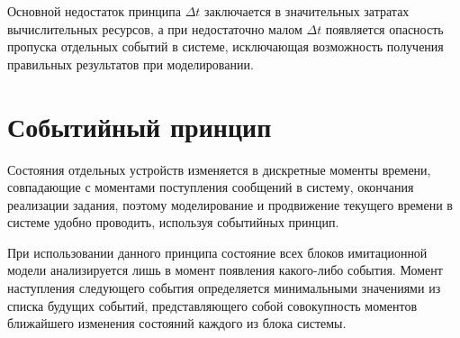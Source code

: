 Основной недостаток принципа $\Delta t$ заключается в значительных затратах вычислительных ресурсов, а при недостаточно малом $\Delta t$ появляется опасность пропуска отдельных событий в системе, исключающая возможность получения правильных результатов при моделировании.

\chapter{Событийный принцип}

Состояния отдельных устройств изменяется в дискретные моменты времени, совпадающие с моментами поступления сообщений в систему, окончания реализации задания, поэтому моделирование и продвижение текущего времени в системе удобно проводить, используя событийных принцип.

При использовании данного принципа состояние всех блоков имитационной модели анализируется лишь в момент появления какого-либо события. 
Момент наступления следующего события определяется минимальными значениями из списка будущих событий, представляющего собой совокупность моментов ближайшего изменения состояний каждого из блока системы.